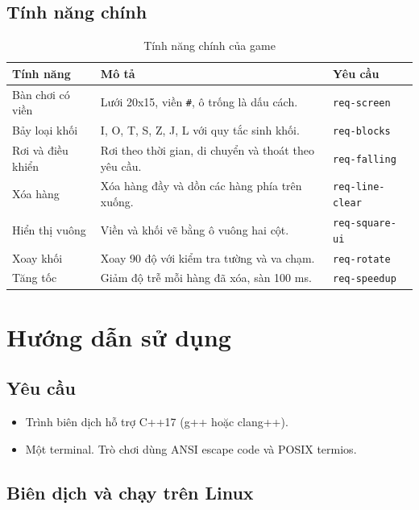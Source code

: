 \documentclass[12pt,a4paper]{article}
\begin{document}
\subsection{Tính năng chính}

\begin{table}[H]
  \centering
  \small
  \caption{Tính năng chính của game}
  \begin{tabularx}{\textwidth}{P{3.0cm} Y P{2.6cm}}
    \toprule
    \textbf{Tính năng} & \textbf{Mô tả} & \textbf{Yêu cầu} \\
    \midrule
    Bàn chơi có viền & Lưới 20x15, viền \texttt{\#}, ô trống là dấu cách. & \texttt{req-screen} \\
    Bảy loại khối & I, O, T, S, Z, J, L với quy tắc sinh khối. & \texttt{req-blocks} \\
    Rơi và điều khiển & Rơi theo thời gian, di chuyển và thoát theo yêu cầu. & \texttt{req-falling} \\
    Xóa hàng & Xóa hàng đầy và dồn các hàng phía trên xuống. & \texttt{req-line-clear} \\
    Hiển thị vuông & Viền và khối vẽ bằng ô vuông hai cột. & \texttt{req-square-ui} \\
    Xoay khối & Xoay 90 độ với kiểm tra tường và va chạm. & \texttt{req-rotate} \\
    Tăng tốc & Giảm độ trễ mỗi hàng đã xóa, sàn 100 ms. & \texttt{req-speedup} \\
    \bottomrule
  \end{tabularx}
\end{table}

\section{Hướng dẫn sử dụng}

\subsection{Yêu cầu}

\begin{itemize}
  \item Trình biên dịch hỗ trợ C++17 (g++ hoặc clang++).
  \item Một terminal. Trò chơi dùng ANSI escape code và POSIX termios.
\end{itemize}

\subsection{Biên dịch và chạy trên Linux}
\end{document}
